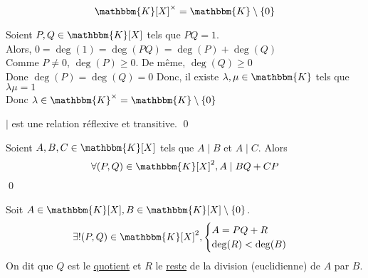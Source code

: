\begin{lem}
	\[
		\mathbbm{K}[X]^\times = \mathbbm{K}\setminus \{0\}
	\] 
\end{lem}

\begin{prv}
	Soient $P,Q \in \mathbbm{K}[X]$ tels que $PQ = 1$.\\
	Alors, $0 = \deg(1) = \deg(PQ) = \deg(P) + \deg(Q)$\\
	Comme  $P \neq 0$, $\deg(P) \ge 0$. De même, $\deg(Q) \ge 0$\\
	Done $\deg(P) = \deg(Q) = 0$ Donc, il existe  $\lambda, \mu \in \mathbbm{K}$ tels que $\lambda \mu = 1$ \\
	Donc $\lambda \in \mathbbm{K}^\times  = \mathbbm{K}\setminus \{0\}$
\end{prv}

\begin{prop}
	$\mid$ est une relation réflexive et transitive.
	\qed
\end{prop}

\begin{prop}
	Soient $A,B, C \in \mathbbm{K}[X]$ tels que $A \mid B$ et $A \mid C$. Alors \[
		\forall (P,Q) \in \mathbbm{K}[X]^2, A  \mid  BQ + CP
	\] \qed
\end{prop}

\begin{prop-defn}
	Soit $A \in \mathbbm{K}[X], B \in \mathbbm{K}[X]\setminus \{0\}$.
	\[
		\exists !(P,Q) \in \mathbbm{K}[X]^2, \begin{cases}
			A = PQ + R\\
			\deg(R) < \deg(B)
		\end{cases}
	\]
	On dit que $Q$ est le \underline{quotient} et $R$ le \underline{reste} de la division (euclidienne) de $A$ par $B$.
\end{prop-defn}


